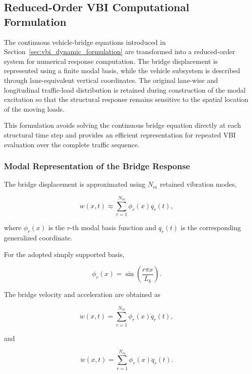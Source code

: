 \documentclass[journal]{IEEEtran}
\begin{document}
\subsection{Reduced-Order VBI Computational Formulation}
\label{sec:reduced_vbi}

The continuous vehicle-bridge
equations introduced in Section~\ref{sec:vbi_dynamic_formulation} are transformed into a reduced-order system
for numerical response computation. The bridge displacement is represented
using a finite modal basis, while the vehicle subsystem is described through
lane-equivalent vertical coordinates. The original lane-wise and longitudinal
traffic-load distribution is retained during construction of the modal
excitation so that the structural response remains sensitive to the spatial
location of the moving loads.

This formulation avoids
solving the continuous bridge equation directly at each structural time step
and provides an efficient representation for repeated VBI evaluation over the
complete traffic sequence.



\subsubsection{Modal Representation of the Bridge Response}

The bridge displacement
is approximated using $N_m$ retained vibration
modes,

\begin{equation}
w(x,t)
\approx
\sum_{r=1}^{N_m}
\phi_r(x)q_r(t),
\end{equation}

where $\phi_r(x)$ is the $r$-th modal basis
function and $q_r(t)$ is the corresponding
generalized coordinate.

For the adopted simply
supported basis,

\begin{equation}
\phi_r(x)
=
\sin
\left(
\frac{r\pi x}{L_b}
\right).
\end{equation}

The bridge velocity and
acceleration are obtained as

\begin{equation}
\dot{w}(x,t)
=
\sum_{r=1}^{N_m}
\phi_r(x)\dot{q}_r(t),
\end{equation}

and

\begin{equation}
\ddot{w}(x,t)
=
\sum_{r=1}^{N_m}
\phi_r(x)\ddot{q}_r(t).
\end{equation}
\end{document}

